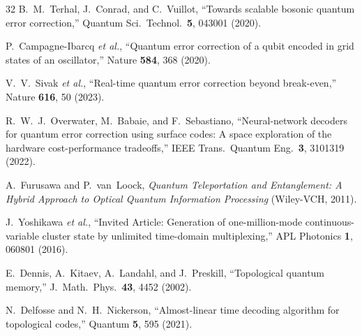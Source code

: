 \documentclass[twocolumn,showpacs,preprintnumbers,amsmath,amssymb,superscriptaddress]{revtex4-2}
\begin{document}
\begin{thebibliography}{32}
B.~M.~Terhal, J.~Conrad, and C.~Vuillot,
``Towards scalable bosonic quantum error correction,''
Quantum Sci.\ Technol.\ \textbf{5}, 043001 (2020).

P.~Campagne-Ibarcq \emph{et al.},
``Quantum error correction of a qubit encoded in grid states of an oscillator,''
Nature \textbf{584}, 368 (2020).

V.~V.~Sivak \emph{et al.},
``Real-time quantum error correction beyond break-even,''
Nature \textbf{616}, 50 (2023).

R.~W.~J.~Overwater, M.~Babaie, and F.~Sebastiano,
``Neural-network decoders for quantum error correction using surface codes: A space exploration of the hardware cost-performance tradeoffs,''
IEEE Trans.\ Quantum Eng.\ \textbf{3}, 3101319 (2022).

A.~Furusawa and P.~van~Loock,
\emph{Quantum Teleportation and Entanglement: A Hybrid Approach to Optical Quantum Information Processing} (Wiley-VCH, 2011).

J.~Yoshikawa \emph{et al.},
``Invited Article: Generation of one-million-mode continuous-variable cluster state by unlimited time-domain multiplexing,''
APL Photonics \textbf{1}, 060801 (2016).

E.~Dennis, A.~Kitaev, A.~Landahl, and J.~Preskill,
``Topological quantum memory,''
J.\ Math.\ Phys.\ \textbf{43}, 4452 (2002).

N.~Delfosse and N.~H.~Nickerson,
``Almost-linear time decoding algorithm for topological codes,''
Quantum \textbf{5}, 595 (2021).

\end{thebibliography}
\end{document}
